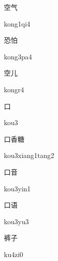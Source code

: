 \begin{multicols*}{2}
\begin{verbete}[kong1qi4]{空气}
\begin{pronuncia}{kong1qi4}
\end{pronuncia}
\end{verbete}

\begin{verbete}[kong3pa4]{恐怕}
\begin{pronuncia}{kong3pa4}
\end{pronuncia}
\end{verbete}

\begin{verbete}[kongr4]{空儿}
\begin{pronuncia}{kongr4}
\end{pronuncia}
\end{verbete}

\begin{verbete}[kou3]{口}
\begin{pronuncia}{kou3}
\end{pronuncia}
\end{verbete}

\begin{verbete}{口香糖}
\begin{pronuncia}{kou3xiang1tang2}
\end{pronuncia}
\end{verbete}

\begin{verbete}{口音}
\begin{pronuncia}{kou3yin1}
\end{pronuncia}
\end{verbete}

\begin{verbete}[kou3yu3]{口语}
\begin{pronuncia}{kou3yu3}
\end{pronuncia}
\end{verbete}

\begin{verbete}[ku4zi0]{裤子}
\begin{pronuncia}{ku4zi0}
\end{pronuncia}
\end{verbete}


\end{multicols*}
